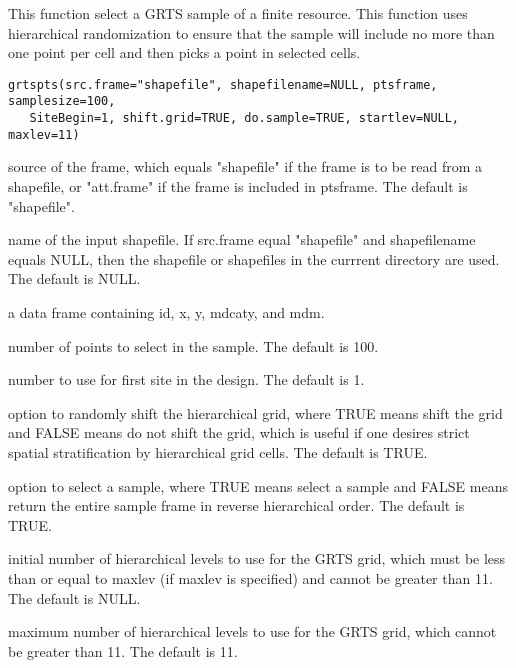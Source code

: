 \begin{Description}\relax
This function select a GRTS sample of a finite resource.  This function uses
hierarchical randomization to ensure that the sample will include no more
than one point per cell and then picks a point in selected cells.
\end{Description}
\begin{Usage}
\begin{verbatim}
grtspts(src.frame="shapefile", shapefilename=NULL, ptsframe, samplesize=100,
   SiteBegin=1, shift.grid=TRUE, do.sample=TRUE, startlev=NULL, maxlev=11) 
\end{verbatim}
\end{Usage}
\begin{Arguments}
\begin{ldescription}
\item[\code{src.frame}] source of the frame, which equals "shapefile" if the frame is
to be read from a shapefile, or "att.frame" if the frame is included in
ptsframe.  The default is "shapefile".
\item[\code{shapefilename}] name of the input shapefile.  If src.frame equal
"shapefile" and shapefilename equals NULL, then the shapefile or shapefiles
in the currrent directory are used.  The default is NULL.
\item[\code{ptsframe}] a data frame containing id, x, y, mdcaty, and mdm.
\item[\code{samplesize}] number of points to select in the sample.  The default is
100.
\item[\code{SiteBegin}] number to use for first site in the design.  The default is
1.
\item[\code{shift.grid}] option to randomly shift the hierarchical grid, where TRUE
means shift the grid and FALSE means do not shift the grid, which is
useful if one desires strict spatial stratification by hierarchical grid
cells.  The default is TRUE.
\item[\code{do.sample}] option to select a sample, where TRUE means select a sample 
and FALSE means return the entire sample frame in reverse hierarchical 
order.  The default is TRUE.
\item[\code{startlev}] initial number of hierarchical levels to use for the GRTS
grid, which must be less than or equal to maxlev (if maxlev is specified)
and cannot be greater than 11.  The default is NULL.
\item[\code{maxlev}] maximum number of hierarchical levels to use for the GRTS grid,
which cannot be greater than 11.  The default is 11.
\end{ldescription}
\end{Arguments}
